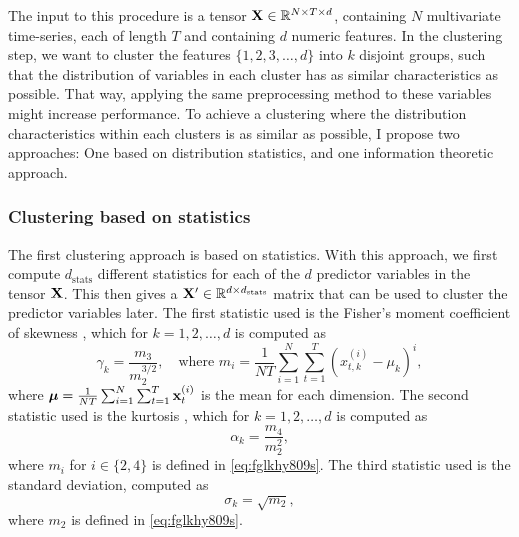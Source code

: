 \documentclass{statsmsc}
\begin{document}
The input to this procedure is a tensor $\mathbf{X} \in \mathbb{R}^{N \times T \times d}$, containing $N$
multivariate time-series, each of length $T$ and containing $d$ numeric features.
In the clustering step, we want to cluster the features $\{1,2,3,\dots,d\}$ into $k$ disjoint groups,
such that the distribution of variables in each cluster has as similar characteristics as possible.
That way, applying the same preprocessing method to these variables might increase performance.
To achieve a clustering where the distribution characteristics within each clusters is as similar
as possible, I propose two approaches: One based on distribution statistics, and one information
theoretic approach.

\subsubsection{Clustering based on statistics}%
\label{sub:Clustering based on statistics}

The first clustering approach is based on statistics. With this approach, we first compute
$d_{\textrm{stats}}$ different statistics for each of the $d$ predictor variables in the tensor
$\mathbf{X}$. This then gives a $\mathbf{X}' \in \mathbb{R}^{d \times d_{\textrm{stats} }}$ matrix that can be used
to cluster the predictor variables later. The first statistic used is the Fisher's moment
coefficient of skewness \citep{shape}, which for $k=1,2,\dots,d$ is computed as
\begin{equation}\label{eq:fglkhy809s}
    \gamma_k=\frac{m_3}{m_2^{3/2}}, \quad \textrm{where }
    m_i=  \frac{1}{NT} \sum^{N}_{i=1} \sum^{T}_{t=1} \left(x^{(i)}_{t,k}-\mu_k \right)^i,
\end{equation}
where $\bm{\mu}=\frac{1}{NT}\sum^{N}_{i=1} \sum^{T}_{t=1} \mathbf{x}^{(i)}_t$ is the mean for each dimension. The second statistic used is the kurtosis \citep{shape}, which for $k=1,2,\dots,d$ is computed as
\begin{equation}
    \alpha_k=\frac{m_4}{m_2^2},
\end{equation}
where $m_i$ for $i\in \{2,4\}$ is defined in  \cref{eq:fglkhy809s}.
The third statistic used is the standard deviation, computed as
\begin{equation}
    \sigma_k=\sqrt{m_2},
\end{equation}
where $m_2$ is defined in \cref{eq:fglkhy809s}.
\end{document}
